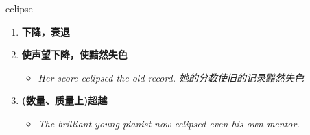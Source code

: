 
\begin{frame}
{\huge eclipse}
\begin{center}
\begin{enumerate}\Large
  \item \textbf{下降，衰退}
  \item \textbf{使声望下降，使黯然失色}
  \begin{itemize}
    \item \em{\Large{Her score eclipsed the old record. 她的分数使旧的记录黯然失色}}
  \end{itemize}
  \item \textbf{(数量、质量上)超越}
  \begin{itemize}
    \item \em{\Large{The brilliant young pianist now eclipsed even his own mentor.}}
  \end{itemize}
\end{enumerate}
\end{center}
\end{frame}
